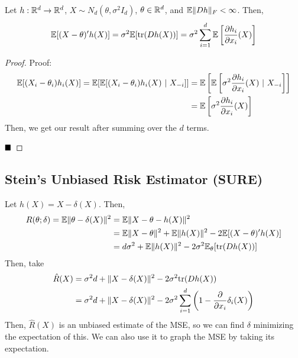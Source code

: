 \begin{theorem}
    Let $h : \mathbb{R}^d \to \mathbb{R}^d$, $X \sim N_d(\theta, \sigma^2 I_d)$, $\theta \in \mathbb{R}^d$, and $\mathbb{E}\lVert {Dh} \rVert_F < \infty$. Then,
    \[ \mathbb{E}[(X - \theta)'h(X)] = \sigma^2\mathbb{E}[\text{tr}(Dh(X))] = \sigma^2\sum_{i = 1}^{d} \mathbb{E}\left[\frac{\partial h_i}{\partial x_i}(X)\right] \]
\end{theorem}
\begin{proof}{Proof:}
    \begin{align*}
        \mathbb{E}[(X_i - \theta_i)h_i(X)] = \mathbb{E}[\mathbb{E}[(X_i - \theta_i)h_i(X) \ |\  X_{-i}]] &= \mathbb{E}\left[\mathbb{E}\left[\sigma^2\frac{\partial h_i}{\partial x_i}(X) \ |\  X_{-i}\right]\right]\\
        &= \mathbb{E}\left[\sigma^2\frac{\partial h_i}{\partial x_i}(X)\right]
    \end{align*}
    Then, we get our result after summing over the $d$ terms.

    $\qed$
\end{proof}

\subsection*{Stein's Unbiased Risk Estimator (SURE)}
\sectionspace

Let $h(X) = X - \delta(X)$. Then,
\begin{align*}
    R(\theta; \delta) = \mathbb{E}\lVert {\theta - \delta(X)} \rVert^2 &= \mathbb{E}\lVert {X - \theta - h(X)} \rVert^2\\
    &= \mathbb{E}\lVert {X - \theta} \rVert^2 + \mathbb{E}\lVert {h(X)} \rVert^2 - 2\mathbb{E}[(X - \theta)'h(X)]\\
    &= d\sigma^2 + \mathbb{E}\lVert {h(X)} \rVert^2 - 2\sigma^2\mathbb{E}_{\theta}[\text{tr}(Dh(X))]
\end{align*}
Then, take
\begin{align*}
    \hat{R}(X) &= \sigma^2 d + \lVert {X - \delta(X)} \rVert^2 - 2\sigma^2\text{tr}(Dh(X))\\
    &= \sigma^2 d + \lVert {X - \delta(X)} \rVert^2 - 2\sigma^2\sum_{i = 1}^{d}\left(1 - \frac{\partial}{\partial x_i}\delta_i(X)\right)
\end{align*}
Then, $\hat{R}(X)$ is an unbiased estimate of the MSE, so we can find $\delta$ minimizing the expectation of this. We can also use it to graph the MSE by taking its expectation.

